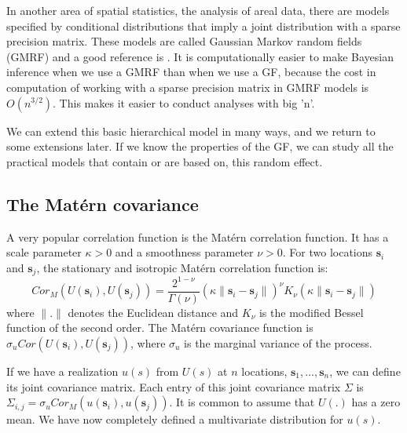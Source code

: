 In another area of spatial statistics, the 
analysis of areal data, there are models specified 
by conditional distributions that imply a joint 
distribution with a sparse precision matrix. 
These models are called Gaussian Markov random 
fields (GMRF) and a good reference is 
\cite{RueHeld:2005}. 
It is computationally easier to make Bayesian 
inference when we use a GMRF than when we use a 
GF, because the cost in computation of working 
with a sparse precision matrix in GMRF models is 
$O(n^{3/2})$.  
This makes it easier to conduct analyses 
with big 'n'. 

We can extend this basic hierarchical model in many ways,
and we return to some extensions later. 
If we know the properties of the GF, 
we can study all the practical models 
that contain or are based on, this random effect. 

\subsection{The Mat\'{e}rn covariance}\label{sec:matern} 

A very popular correlation function is the 
Mat\'ern correlation function. 
It has a scale parameter $\kappa>0$ 
and a smoothness parameter $\nu>0$. 
For two locations $\textbf{s}_i$ and $\textbf{s}_j$, the stationary 
and isotropic Mat\'ern correlation function is: 
\begin{equation}
Cor_M(U(\textbf{s}_i), U(\textbf{s}_j)) = 
\frac{2^{1-\nu}}{\Gamma(\nu)}
(\kappa \parallel \textbf{s}_i - \textbf{s}_j\parallel)^\nu 
K_\nu(\kappa \parallel \textbf{s}_i - \textbf{s}_j \parallel)
\end{equation}
where $\parallel . \parallel$ denotes 
the Euclidean distance and $K_\nu$ is the modified 
Bessel function of the second order. 
The Mat\'ern covariance function is
$\sigma_u Cor(U(\textbf{s}_i), U(\textbf{s}_j))$, where 
$\sigma_u$ is the marginal variance of the process. 

If we have a realization $u(s)$ from $U(s)$ 
at $n$ locations, $\textbf{s}_1, ..., \textbf{s}_n$, 
we can define its joint covariance matrix. 
Each entry of this joint covariance matrix $\Sigma$ is 
$\Sigma_{i,j} = \sigma_uCor_M(u(\textbf{s}_i), u(\textbf{s}_j))$. 
It is common to assume that $U(.)$ has a zero mean. 
We have now completely defined a multivariate 
distribution for $u(s)$. 

